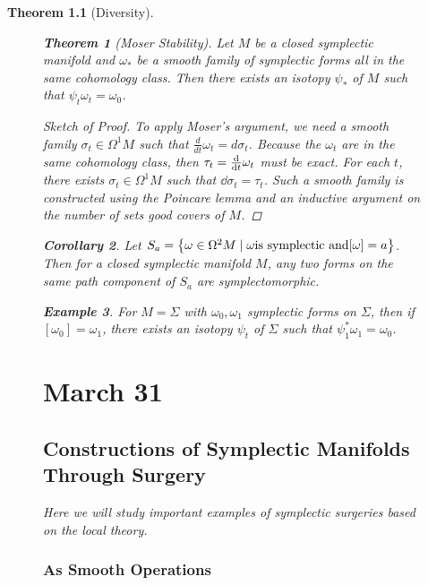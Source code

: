 \documentclass[leqno, openany]{memoir}
\newtheorem{thm}{Theorem}[chapter]
\newtheorem{cor}[thm]{Corollary}
\theoremstyle{definition}
\newtheorem{exm}[thm]{Example}
\theoremstyle{remark}
\theoremstyle{plain}
\theoremstyle{definition}
\theoremstyle{remark}
\begin{document}
\begin{thm}[Diversity]
\begin{figure}[H]
    \begin{thm}[Moser Stability] Let $M$ be a closed symplectic manifold and
        $\omega_*$ be a smooth family of symplectic forms all in the same
        cohomology class. Then there exists an isotopy $\psi_*$ of $M$ such
        that $\psi_t \omega_t = \omega_0$.  \end{thm}

    \begin{proof}[Sketch of Proof] To apply Moser's argument, we need a smooth
        family $\sigma_t \in \Omega^1 M$ such that $\frac{d}{dt} \omega_t = d
        \sigma_t$. Because the $\omega_t$ are in the same cohomology class,
        then $\tau_t = \dv{t} \omega_t$ must be exact. For each $t$, there
        exists $\sigma_t \in \Omega^1 M$ such that $\dd{\sigma_t} = \tau_t$.
        Such a \textit{smooth} family is constructed using the Poincare lemma
        and an inductive argument on the number of sets good covers of $M$.
    \end{proof}

    \begin{cor} Let $S_a = \qty{\omega \in \Omega^2 M \mid \omega \text{is
    symplectic and} [\omega] = a}$. Then for a closed symplectic manifold $M$,
any two forms on the same path component of $S_a$ are symplectomorphic.
\end{cor}

    \begin{exm} For $M = \Sigma$ with $\omega_0, \omega_1$ symplectic forms on
    $\Sigma$, then if $[\omega_0] = \omega_1$, there exists an isotopy $\psi_t$
of $\Sigma$ such that $\psi_1^* \omega_1 = \omega_0$.  \end{exm}

    \chapter{March 31}%
    
    \section{Constructions of Symplectic Manifolds Through Surgery}%
    \label{sec:constructions_of_symplectic_manifolds_through_surgery}
    
    Here we will study important examples of \textit{symplectic} surgeries
    based on the local theory.

    \subsection{As Smooth Operations}%


\end{figure}
\end{thm}
\end{document}
